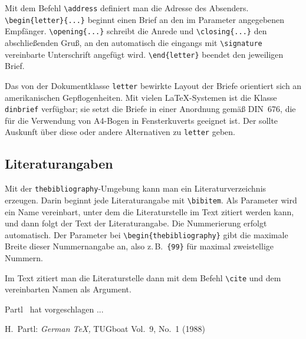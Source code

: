Mit dem Befehl \verb|\address| definiert man die Adresse des Absenders.
\verb|\begin{letter}{...}| beginnt einen Brief an den im
Parameter angegebenen Empfänger.
\verb|\opening{...}| schreibt die Anrede 
und \verb|\closing{...}| den abschließenden Gruß, 
an den automatisch die eingangs mit
\verb|\signature| vereinbarte Unterschrift angefügt wird.
\verb|\end{letter}| beendet den jeweiligen Brief.

Das von der Dokumentklasse \texttt{letter} bewirkte Layout der Briefe 
orientiert sich an amerikanischen Gepflogenheiten.
Mit vielen \LaTeX-Systemen ist die Klasse 
\texttt{dinbrief} verfügbar; sie setzt die Briefe in einer
Anordnung gemäß DIN~676, 
die für die Verwendung von A4-Bogen in Fensterkuverts geeignet ist.
Der \local{} sollte Auskunft über diese oder andere Alternativen zu
\texttt{letter} geben.

\subsection{Literaturangaben}

Mit der \texttt{thebibliography}-Umgebung kann man ein
Literaturverzeichnis erzeugen.
Darin beginnt jede Literaturangabe mit \verb|\bibitem|.
Als Parameter wird ein Name vereinbart, unter dem die
Literaturstelle im Text zitiert werden kann, und
dann folgt der Text der Literaturangabe.
Die Nummerierung erfolgt automatisch.
Der Parameter bei \verb|\begin{thebibliography}| gibt die
maximale Breite dieser Nummernangabe an, also z.\,B.\ 
\verb|{99}| für maximal zweistellige Nummern.

Im Text zitiert man die Literaturstelle dann mit dem Befehl \verb|\cite|
und dem vereinbarten Namen als Argument.


\begin{LTXexample}
Partl~\cite{pa} hat
vorgeschlagen ...
 
\begin{thebibliography}{99}
H.~Partl: \textit{German \TeX,}
TUGboat Vol.~9, No.~1 (1988)
\end{thebibliography}
\end{LTXexample}

 
